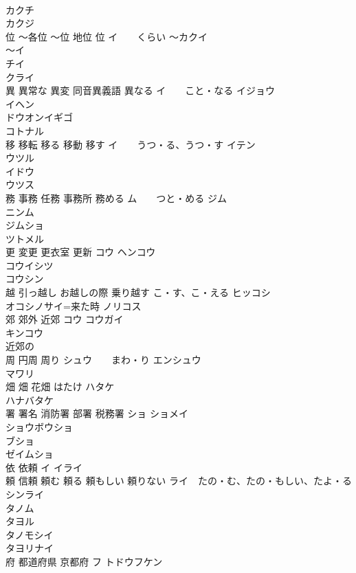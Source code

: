 \documentclass[8pt]{extreport}
\begin{document}
\begin{CJK}{UTF8}{min}
\\	カクチ
\\	カクジ 
\\	位 〜各位 〜位 地位 位	イ　　くらい 〜カクイ 
\\	〜イ 
\\	チイ 
\\	クライ 
\\	異 異常な 異変 同音異義語 異なる	イ　　こと・なる イジョウ 
\\	イヘン 
\\	ドウオンイギゴ 
\\	コトナル 
\\	移 移転 移る 移動 移す	イ　　うつ・る、うつ・す イテン 
\\	ウツル 
\\	イドウ 
\\	ウツス 
\\	務 事務 任務 事務所 務める	ム　　つと・める ジム 
\\	ニンム 
\\	ジムショ
\\	ツトメル 
\\	更 変更 更衣室 更新	コウ ヘンコウ 
\\	コウイシツ 
\\	コウシン
\\	越 引っ越し お越しの際 乗り越す	こ・す、こ・える ヒッコシ 
\\	オコシノサイ=来た時 ノリコス 
\\	郊 郊外 近郊	コウ コウガイ 
\\	キンコウ 
\\	近郊の 
\\	周 円周 周り	シュウ　　まわ・り エンシュウ 
\\	マワリ 
\\	畑 畑 花畑	はたけ ハタケ 
\\	ハナバタケ 
\\	署 署名 消防署 部署 税務署	ショ ショメイ
\\	ショウボウショ
\\	ブショ
\\	ゼイムショ
\\	依 依頼	イ イライ
\\	頼 信頼 頼む 頼る 頼もしい 頼りない	ライ　たの・む、たの・もしい、たよ・る シンライ
\\	タノム
\\	タヨル
\\	タノモシイ
\\	タヨリナイ 
\\	府 都道府県 京都府	フ トドウフケン 

\end{CJK}
\end{document}
